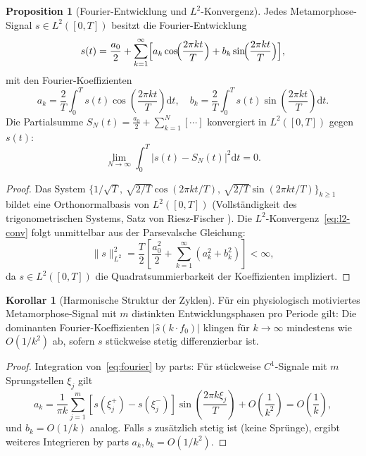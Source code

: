 ﻿\documentclass[12pt, a4paper]{article}
\theoremstyle{definition}
\newtheorem{korollar}[theorem]{Korollar}
\newtheorem{proposition}[theorem]{Proposition}
\newcommand{\dd}{\mathrm{d}}
\begin{document}
\begin{proposition}[Fourier-Entwicklung und $L^2$-Konvergenz]\label{prop:fourier}
Jedes Metamorphose-Signal $s \in L^2([0,T])$ besitzt die Fourier-Entwicklung
\begin{equation}\label{eq:fourier}
  s(t) = \frac{a_0}{2} + \sum_{k=1}^\infty \Bigl[a_k \cos\!\Bigl(\frac{2\pi k t}{T}\Bigr)
  + b_k \sin\!\Bigl(\frac{2\pi k t}{T}\Bigr)\Bigr],
\end{equation}
mit den Fourier-Koeffizienten
\[
  a_k = \frac{2}{T}\int_0^T s(t)\cos\!\left(\frac{2\pi k t}{T}\right)\dd t,\quad
  b_k = \frac{2}{T}\int_0^T s(t)\sin\!\!\left(\frac{2\pi k t}{T}\right)\dd t.
\]
Die Partialsumme $S_N(t) = \frac{a_0}{2} + \sum_{k=1}^N [\cdots]$ konvergiert in
$L^2([0,T])$ gegen $s(t)$:
\begin{equation}\label{eq:l2-conv}
  \lim_{N\to\infty} \int_0^T \bigl|s(t) - S_N(t)\bigr|^2 \dd t = 0.
\end{equation}
\end{proposition}

\begin{proof}
Das System $\{1/\sqrt{T},\, \sqrt{2/T}\cos(2\pi k t/T),\, \sqrt{2/T}\sin(2\pi k t/T)\}_{k \geq 1}$
bildet eine Orthonormalbasis von $L^2([0,T])$ (Vollständigkeit des trigonometrischen
Systems, Satz von Riesz-Fischer \cite{Rudin1987}). Die $L^2$-Konvergenz~\eqref{eq:l2-conv}
folgt unmittelbar aus der Parsevalsche Gleichung:
\[
  \|s\|_{L^2}^2 = \frac{T}{2}\left[\frac{a_0^2}{2} + \sum_{k=1}^\infty (a_k^2 + b_k^2)\right] < \infty,
\]
da $s \in L^2([0,T])$ die Quadratsummierbarkeit der Koeffizienten impliziert. \hfill
\end{proof}

\begin{korollar}[Harmonische Struktur der Zyklen]\label{cor:harmonisch}
Für ein physiologisch motiviertes Metamorphose-Signal mit $m$ distinkten
Entwicklungsphasen pro Periode gilt: Die dominanten Fourier-Koeffizienten
$|\hat{s}(k\cdot f_0)|$ klingen für $k \to \infty$ mindestens wie $O(1/k^2)$ ab,
sofern $s$ stückweise stetig differenzierbar ist.
\end{korollar}

\begin{proof}
Integration von~\eqref{eq:fourier} by parts: Für stückweise $C^1$-Signale mit
$m$ Sprungstellen $\xi_j$ gilt
\[
  a_k = \frac{1}{\pi k}\sum_{j=1}^m [s(\xi_j^+) - s(\xi_j^-)] \sin\!\left(\frac{2\pi k\xi_j}{T}\right)
  + O\!\left(\frac{1}{k^2}\right) = O\!\left(\frac{1}{k}\right),
\]
und $b_k = O(1/k)$ analog. Falls $s$ zusätzlich stetig ist (keine Sprünge), ergibt
weiteres Integrieren by parts $a_k, b_k = O(1/k^2)$. \hfill
\end{proof}
\end{document}

